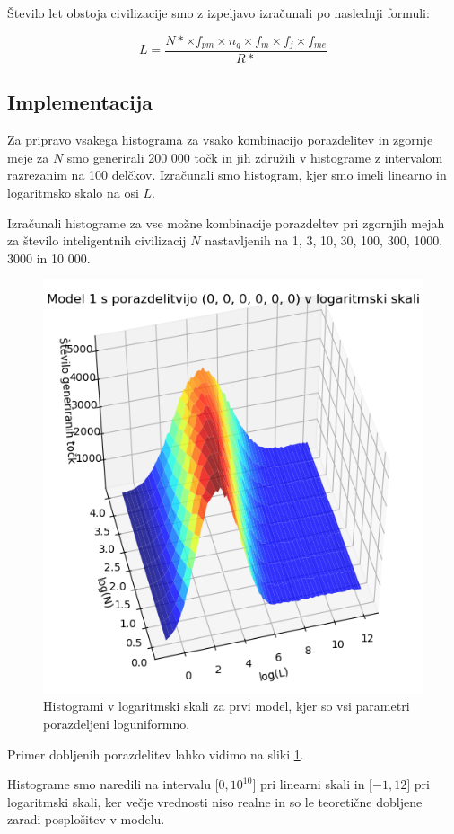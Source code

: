 \documentclass[a4paper]{IEEEtran}
\begin{document}
Število let obstoja civilizacije smo z izpeljavo izračunali po naslednji formuli:

\begin{equation}
L = \frac{N*\times  f_{pm} \times n_g \times f_m \times f_j \times f_{me}}{R*} \nonumber
\end{equation}

\subsection{Implementacija}

Za pripravo vsakega histograma za vsako kombinacijo porazdelitev in zgornje meje za $N$ smo generirali 200 000 točk in jih združili v histograme z intervalom razrezanim na 100 delčkov. Izračunali smo histogram, kjer smo imeli linearno in logaritmsko skalo na osi $L$.

Izračunali histograme za vse možne kombinacije porazdeltev
pri zgornjih mejah za število inteligentnih civilizacij $N$ nastavljenih na 1, 3, 10, 30, 100, 300, 1000, 3000 in 10 000.

\begin{figure}[!h]
	\centering
	\includegraphics[width=0.7\linewidth]{Figures/porazdelitev3D}
	\caption{Histogrami v logaritmski skali za prvi model, kjer so vsi parametri porazdeljeni loguniformno.}
	\label{fig:porazdelitev3d}
\end{figure}

Primer dobljenih porazdelitev lahko vidimo na sliki \ref{fig:porazdelitev3d}.

Histograme smo naredili na intervalu $\lbrack 0, 10^10\rbrack$ pri linearni skali in $\lbrack -1, 12\rbrack$ pri logaritmski skali, ker večje vrednosti niso realne in so le teoretične dobljene zaradi posplošitev v modelu.
\end{document}
